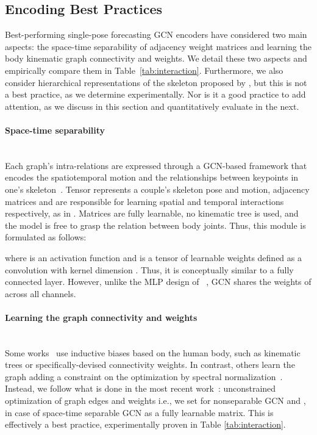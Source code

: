 \documentclass[10pt,twocolumn,letterpaper]{article}
\begin{document}
\subsection{Encoding Best Practices}\label{ssec:enc}
Best-performing single-pose forecasting GCN encoders have considered two main aspects: the space-time separability of adjacency weight matrices and learning the body kinematic graph connectivity and weights. 
We detail these two aspects and empirically compare them in Table~\ref{tab:interaction}. 
Furthermore, we also consider hierarchical representations of the skeleton proposed by \cite{Dang21}, but this is not a best practice, as we determine experimentally.
Nor is it a good practice to add attention, as we discuss in this section and quantitatively evaluate in the next.

\paragraph{Space-time separability}\label{par:sep} \greencheck \\
Each graph's intra-relations are expressed through a GCN-based framework that encodes the spatiotemporal motion and the relationships between keypoints in one's skeleton~\cite{yan18, sofianos21}.
Tensor  represents a couple's skeleton pose and motion, adjacency matrices  and  are responsible for learning spatial and temporal interactions respectively, as in \cite{sofianos21}.
Matrices are fully learnable, no kinematic tree is used, and the model is free to grasp the relation between body joints.
Thus, this module is formulated as follows:

where  is an activation function and  is a tensor of learnable weights defined as a convolution with kernel dimension . 
Thus, it is conceptually similar to a fully connected layer. 
However, unlike the MLP design of ~\cite{guo2022back}, GCN shares the weights of  across all channels.

\paragraph{Learning the graph connectivity and weights} \greencheck \\
Some works~\cite{Dang21, yan18} use inductive biases based on the human body, such as kinematic trees or specifically-devised connectivity weights. In contrast, others learn the graph adding a constraint on the optimization by spectral normalization~\cite{kipf2018neural}.
Instead, we follow what is done in the most recent work~\cite{sofianos21}: unconstrained optimization of graph edges and weights i.e., we set  for nonseparable GCN and ,  in case of space-time separable GCN as a fully learnable matrix. 
This is effectively a best practice, experimentally proven in Table \ref{tab:interaction}.
\end{document}
